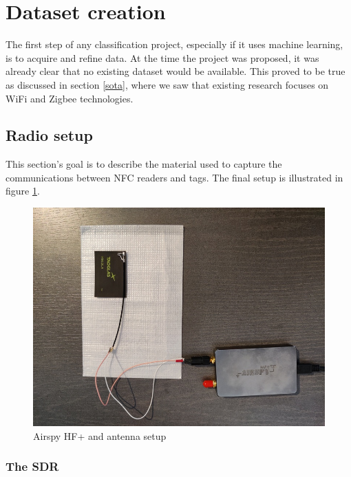 \section{Dataset creation}

The first step of any classification project, especially if it uses machine learning, is to acquire and refine data. At the time the project was proposed, it was already clear that no existing dataset would be available. This proved to be true as discussed in section \ref{sota}, where we saw that existing research focuses on WiFi and Zigbee technologies.

\subsection{Radio setup}

This section's goal is to describe the material used to capture the communications between NFC readers and tags. The final setup is illustrated in figure \ref{fig:radio-setup}.

\begin{figure}[htp!]
  \centering
  \includegraphics[scale=0.35]{figures/data_sdr-setup2.jpg}
  \caption{Airspy HF+ and antenna setup}
  \label{fig:radio-setup}
\end{figure}

\subsubsection{The SDR}

